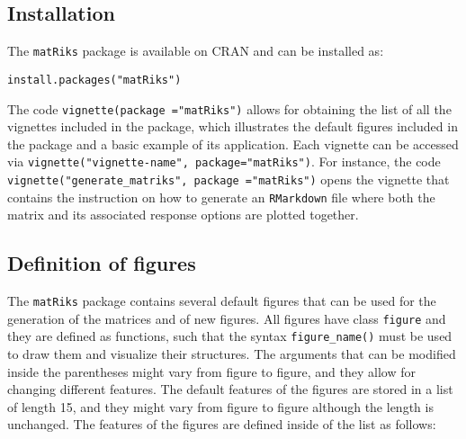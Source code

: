 \subsection{Installation}\label{installation}

The \texttt{matRiks} package is available on CRAN and can be installed as:

\begin{verbatim}
install.packages("matRiks")
\end{verbatim}

The code \texttt{vignette(package\ ="matRiks")} allows for obtaining the list of all the vignettes included in the package, which illustrates the default figures included in the package and a basic example of its application.
Each vignette can be accessed via \texttt{vignette("vignette-name",\ package="matRiks")}.
For instance, the code \texttt{vignette("generate\_matriks",\ package\ ="matRiks")} opens the vignette that contains the instruction on how to generate an \texttt{RMarkdown} file where both the matrix and its associated response options are plotted together.

\subsection{Definition of figures}\label{definition-of-figures}

The \texttt{matRiks} package contains several default figures that can be used for the generation of the matrices and of new figures.
All figures have class \texttt{figure} and they are defined as functions, such that the syntax \texttt{figure\_name()} must be used to draw them and visualize their structures.
The arguments that can be modified inside the parentheses might vary from figure to figure, and they allow for changing different features.
The default features of the figures are stored in a list of length 15, and they might vary from figure to figure although the length is unchanged.
The features of the figures are defined inside of the list as follows:

